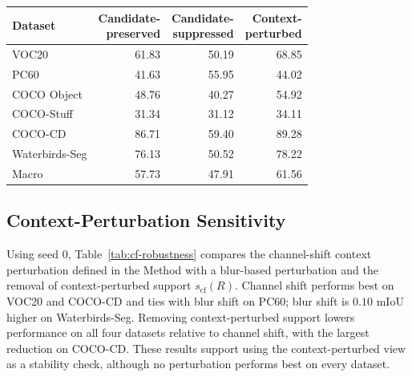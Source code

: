 \documentclass[letterpaper]{article}
\begin{document}
\noindent\begin{minipage}{\columnwidth}
    \centering
    \label{tab:direct-recognition}
    \small
    \setlength{\tabcolsep}{3.6pt}
    \begin{tabular}{lrrr}
        \toprule
        Dataset & \shortstack{Candidate-\\preserved} & \shortstack{Candidate-\\suppressed} & \shortstack{Context-\\perturbed} \\
        \midrule
        VOC20 & 61.83 & 50.19 & 68.85 \\
        PC60 & 41.63 & 55.95 & 44.02 \\
        COCO Object & 48.76 & 40.27 & 54.92 \\
        COCO-Stuff & 31.34 & 31.12 & 34.11 \\
        COCO-CD & 86.71 & 59.40 & 89.28 \\
        Waterbirds-Seg & 76.13 & 50.52 & 78.22 \\
        \midrule
        Macro & 57.73 & 47.91 & 61.56 \\
        \bottomrule
    \end{tabular}
\end{minipage}

\subsection{Context-Perturbation Sensitivity}

Using seed 0, Table~\ref{tab:cf-robustness} compares the channel-shift context perturbation defined in the Method with a blur-based perturbation and the removal of context-perturbed support $s_{\mathrm{cf}}(R)$. Channel shift performs best on VOC20 and COCO-CD and ties with blur shift on PC60; blur shift is $0.10$ mIoU higher on Waterbirds-Seg. Removing context-perturbed support lowers performance on all four datasets relative to channel shift, with the largest reduction on COCO-CD. These results support using the context-perturbed view as a stability check, although no perturbation performs best on every dataset.
\end{document}

